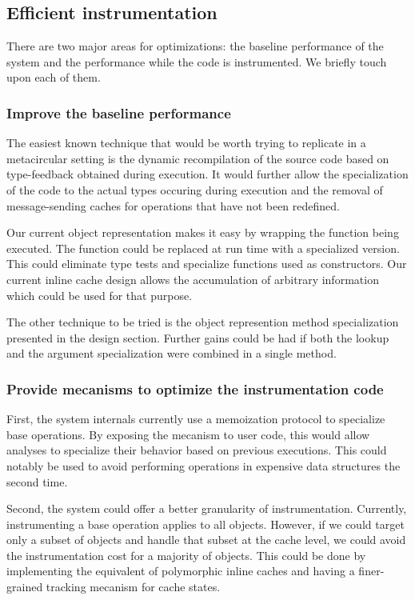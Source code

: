 \subsection{Efficient instrumentation}

There are two major areas for optimizations: the baseline performance of the
system and the performance while the code is instrumented. We briefly touch
upon each of them. 

\subsubsection{Improve the baseline performance}

The easiest known technique that would be worth trying to replicate in a
metacircular setting is the dynamic recompilation of the source code based on
type-feedback obtained during execution. It would further allow the
specialization of the code to the actual types occuring during execution and
the removal of message-sending caches for operations that have not been
redefined.

Our current object representation makes it easy by wrapping the function being
executed.  The function could be replaced at run time with a specialized
version. This could eliminate type tests and specialize functions used as
constructors. Our current inline cache design allows the accumulation of
arbitrary information which could be used for that purpose.

The other technique to be tried is the object represention method
specialization presented in the design section. Further gains could be had if
both the lookup and the argument specialization were combined in a single
method.

\subsubsection{Provide mecanisms to optimize the instrumentation code}

First, the system internals currently use a memoization protocol to specialize base
operations. By exposing the mecanism to user code, this would allow analyses to
specialize their behavior based on previous executions. This could notably be
used to avoid performing operations in expensive data structures the second
time.

Second, the system could offer a better granularity of instrumentation.
Currently, instrumenting a base operation applies to all objects. However, if
we could target only a subset of objects and handle that subset at the cache
level, we could avoid the instrumentation cost for a majority of objects. This
could be done by implementing the equivalent of polymorphic inline caches and
having a finer-grained tracking mecanism for cache states.


